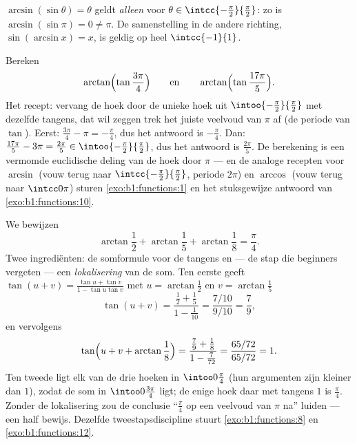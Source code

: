 \begin{remark}
$\arcsin(\sin\theta) = \theta$ geldt \emph{alleen} voor $\theta \in
\intcc{-\frac\pi2}{\frac\pi2}$: zo is $\arcsin(\sin\pi) = 0 \neq \pi$.
De samenstelling in de andere richting, $\sin(\arcsin x) = x$, is geldig
op heel $\intcc{-1}{1}$.
\end{remark}

\begin{example}
\label{ex:b1:functions:wrap}
Bereken
\[
\arctan\Bigl(\tan\frac{3\pi}4\Bigr)
\qquad\text{en}\qquad
\arctan\Bigl(\tan\frac{17\pi}5\Bigr).
\]
Het recept: vervang de hoek door de unieke hoek uit
$\intoo{-\frac\pi2}{\frac\pi2}$ met dezelfde tangens, dat wil zeggen
trek het juiste veelvoud van $\pi$ af (de periode van $\tan$). Eerst:
$\frac{3\pi}4 - \pi = -\frac\pi4$, dus het antwoord is $-\frac\pi4$.
Dan: $\frac{17\pi}5 - 3\pi = \frac{2\pi}5 \in
\intoo{-\frac\pi2}{\frac\pi2}$, dus het antwoord is $\frac{2\pi}5$. De
berekening is een vermomde euclidische deling van de hoek door $\pi$
--- en de analoge recepten voor $\arcsin$ (vouw terug naar
$\intcc{-\frac\pi2}{\frac\pi2}$, periode $2\pi$) en $\arccos$ (vouw
terug naar $\intcc0\pi$) sturen \cref{exo:b1:functions:1} en het
stuksgewijze antwoord van \cref{exo:b1:functions:10}.
\end{example}

\begin{example}\label{ex:b1:functions:arctansum}
We bewijzen
\[
\arctan\frac12 + \arctan\frac15 + \arctan\frac18 = \frac\pi4 .
\]
Twee ingrediënten: de somformule voor de tangens en --- de stap die
beginners vergeten --- een \emph{lokalisering} van de som. Ten eerste
geeft $\tan(u + v) = \frac{\tan u + \tan v}{1 - \tan u\tan v}$ met $u =
\arctan\frac12$ en $v = \arctan\frac15$
\[
\tan(u + v) = \frac{\frac12 + \frac15}{1 - \frac1{10}}
= \frac{7/10}{9/10} = \frac79,
\]
en vervolgens
\[
\tan\Bigl(u + v + \arctan\frac18\Bigr)
= \frac{\frac79 + \frac18}{1 - \frac7{72}}
= \frac{65/72}{65/72} = 1 .
\]
Ten tweede ligt elk van de drie hoeken in $\intoo0{\frac\pi4}$ (hun
argumenten zijn kleiner dan $1$), zodat de som in
$\intoo0{\frac{3\pi}4}$ ligt; de enige hoek daar met tangens $1$ is
$\frac\pi4$. Zonder de lokalisering zou de conclusie ``$\frac\pi4$ op
een veelvoud van $\pi$ na'' luiden --- een half bewijs. Dezelfde
tweestapsdiscipline stuurt \cref{exo:b1:functions:8} en
\cref{exo:b1:functions:12}.
\end{example}

